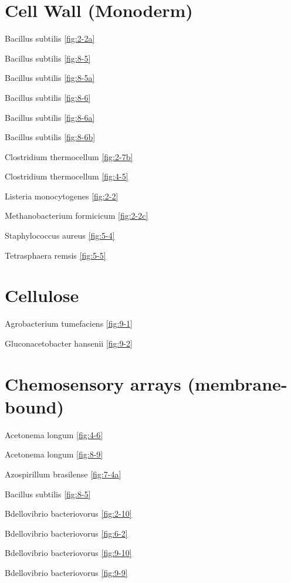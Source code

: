 \documentclass[]{tufte-book}
\begin{document}
\section*{Cell Wall (Monoderm)}\label{cell-wall-monoderm}

Bacillus subtilis \ref{fig:2-2a}

Bacillus subtilis \ref{fig:8-5}

Bacillus subtilis \ref{fig:8-5a}

Bacillus subtilis \ref{fig:8-6}

Bacillus subtilis \ref{fig:8-6a}

Bacillus subtilis \ref{fig:8-6b}

Clostridium thermocellum \ref{fig:2-7b}

Clostridium thermocellum \ref{fig:4-5}

Listeria monocytogenes \ref{fig:2-2}

Methanobacterium formicicum \ref{fig:2-2c}

Staphylococcus aureus \ref{fig:5-4}

Tetrasphaera remsis \ref{fig:5-5}

\section*{Cellulose}\label{cellulose}

Agrobacterium tumefaciens \ref{fig:9-1}

Gluconacetobacter hansenii \ref{fig:9-2}

\section*{Chemosensory arrays
(membrane-bound)}\label{chemosensory-arrays-membrane-bound}

Acetonema longum \ref{fig:4-6}

Acetonema longum \ref{fig:8-9}

Azospirillum brasilense \ref{fig:7-4a}

Bacillus subtilis \ref{fig:8-5}

Bdellovibrio bacteriovorus \ref{fig:2-10}

Bdellovibrio bacteriovorus \ref{fig:6-2}

Bdellovibrio bacteriovorus \ref{fig:9-10}

Bdellovibrio bacteriovorus \ref{fig:9-9}
\end{document}
